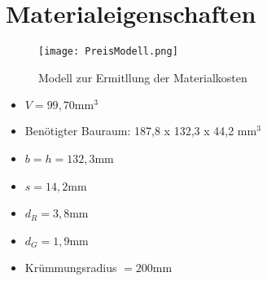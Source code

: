 \chapter{Materialeigenschaften}

\begin{figure}[h]
	\centering
	\texttt{[image: PreisModell.png]}
	\caption{Modell zur Ermitllung der Materialkosten}
	\label{abb_100mmModel}
\end{figure}
\begin{itemize}
		\item $V = 99,70\mathrm{mm}^3$
		\item Benötigter Bauraum: 187,8 x 132,3 x 44,2 mm$^3$
		\item $b = h = 132,3$mm
		\item $s = 14,2$mm
		\item $d_R = 3,8$mm
		\item $d_G = 1,9$mm
		\item Krümmungsradius $=200$mm
\end{itemize}
